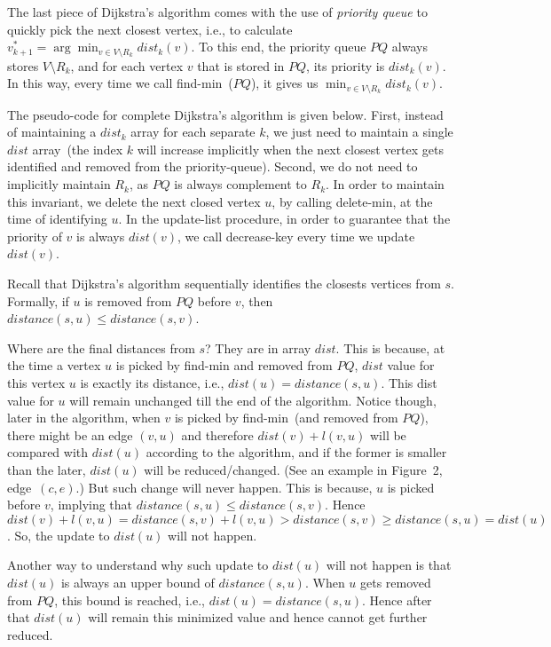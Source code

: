 The last piece of Dijkstra's algorithm comes with the use of \emph{priority queue}
to quickly pick the next closest vertex, i.e., to calculate $v_{k+1}^* = \arg\min_{v\in V\setminus R_k} dist_k(v)$.
To this end, the priority queue $PQ$ always stores $V\setminus R_k$,
and for each vertex $v$ that is stored in $PQ$, its priority is $dist_k(v)$.
In this way, every time we call find-min~($PQ$), it gives us $\min_{v\in V\setminus R_k} dist_k(v)$.

The pseudo-code for complete Dijkstra's algorithm is given below.
First, instead of maintaining a $dist_k$ array for each separate $k$, we just need 
to maintain a single $dist$ array~(the index $k$ will increase implicitly when the next closest vertex
gets identified and removed from the priority-queue). 
Second, we do not need to implicitly maintain $R_k$,
as $PQ$ is always complement to $R_k$.
In order to maintain this invariant, we delete the next closed vertex $u$, 
by calling delete-min, at the time of identifying $u$.
In the update-list procedure, in order to guarantee that the priority of $v$ is
always $dist(v)$, we call decrease-key every time we update $dist(v)$.


Recall that Dijkstra's algorithm sequentially identifies the closests vertices from $s$.
Formally, if $u$ is removed from $PQ$ before $v$, then $distance(s, u) \le distance(s, v)$.

Where are the final distances from $s$?  They are in array $dist$.
This is because, at the time a vertex $u$ is picked by find-min and 
removed from $PQ$,
$dist$ value for this vertex $u$ is exactly its distance, i.e., $dist(u) = distance(s, u)$.
This dist value for $u$ will remain unchanged till the end of the algorithm.
Notice though, later in the algorithm, when $v$ is picked by find-min~(and removed from $PQ$),
there might be an edge $(v, u)$ and therefore $dist(v) + l(v, u)$ will be compared with $dist(u)$ according to the algorithm,
and if the former is smaller than the later, $dist(u)$ will be reduced/changed.
(See an example in Figure~2, edge~$(c, e)$.)
But such change will never happen. This is because, $u$ is picked before $v$, implying that
$distance(s, u) \le distance(s, v)$. Hence $dist(v) + l(v, u) = distance(s, v) + l(v, u) > distance(s, v) \ge distance(s, u) = dist(u)$.
So, the update to $dist(u)$ will not happen.

Another way to understand why such update to $dist(u)$ will not happen
is that $dist(u)$ is always an upper bound of $distance(s,u)$.
When $u$ gets removed from $PQ$, this bound is reached, i.e., $dist(u) = distance(s, u)$.
Hence after that $dist(u)$ will remain this minimized value and hence cannot get further reduced.

